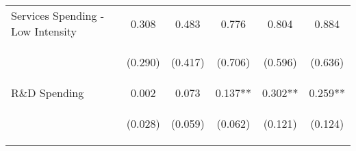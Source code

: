 \begin{tabular}{lccccc}
    Services Spending - Low Intensity & 0.308 & 0.483 & 0.776 & 0.804 & 0.884 \\
    & \begin{footnotesize}(0.290)\end{footnotesize} & \begin{footnotesize}(0.417)\end{footnotesize} & \begin{footnotesize}(0.706)\end{footnotesize} & \begin{footnotesize}(0.596)\end{footnotesize} & \begin{footnotesize}(0.636)\end{footnotesize} \\
    R\&D Spending & 0.002 & 0.073 & 0.137** & 0.302** & 0.259** \\
    & \begin{footnotesize}(0.028)\end{footnotesize} & \begin{footnotesize}(0.059)\end{footnotesize} & \begin{footnotesize}(0.062)\end{footnotesize} & \begin{footnotesize}(0.121)\end{footnotesize} & \begin{footnotesize}(0.124)\end{footnotesize} \\


\end{tabular}
